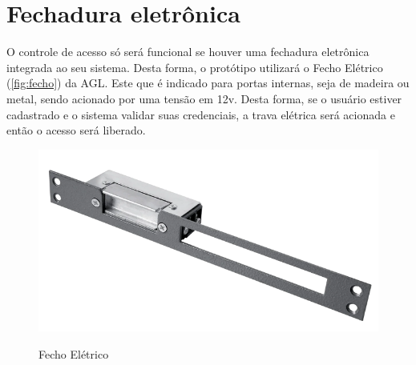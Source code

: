 \section{Fechadura eletrônica}\label{sec:materiais}

O controle de acesso só será funcional se houver uma fechadura eletrônica 
integrada ao seu sistema. Desta forma, o protótipo utilizará o Fecho Elétrico (\autoref{fig:fecho}) 
da AGL. Este que é indicado para portas internas, seja de madeira ou metal, sendo 
acionado por uma tensão em 12v. Desta forma, se o usuário estiver cadastrado 
e o sistema validar suas credenciais, a trava elétrica será acionada e 
então o acesso será liberado.


\begin{figure}[h!]
    \centering
    \caption{Fecho Elétrico}
    \includegraphics[scale=0.3]{figuras/fechoagl.png} 
    \label{fig:fecho}
    \centering
\end{figure}